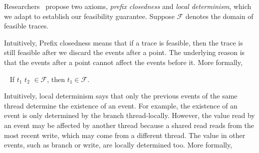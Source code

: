 Researchers~\cite{pldi14,maximal} propose two axioms, {\em prefix closedness} and {\em local determinism}, which we adapt to establish our feasibility guarantee. 
Suppose $\mathcal{F}$ denotes the domain of feasible traces.


Intuitively, Prefix closedness means that if a trace is feasible, then the trace is still feasible after we discard the events after a point. The underlying reason is that the events after a point cannot affect the events before it. More formally,

\begin{myaxiom}~\label{axiom:prefix}
If $t_1$ $t_2$ $\in \mathcal{F}$, then $t_1 \in \mathcal{F}$. 
\end{myaxiom}




Intuitively, local determinism says that only the previous events of the same thread determine the existence of an event. For example, the existence of an event is only determined by the branch  thread-locally. However, the value read by an event may be affected by another thread because a shared read reads from the most recent write, which may come from a different thread. The value in other events, such as branch or write,  are locally determined too.
More formally,





